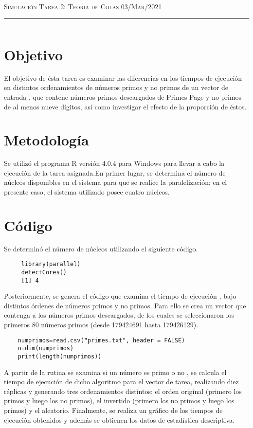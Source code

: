 \documentclass[12pt]{amsart}
\begin{document}
\pagestyle{empty}



\thispagestyle{empty}

{\scshape Simulación} \hfill {\scshape \Large Tarea 2: Teoría de Colas} \hfill  {\scshape 03/Mar/2021}
\author{C. María Montemayor Palos}
\maketitle

\hrule
\hrule
\bigskip


\section{Objetivo}
El objetivo de ésta tarea es examinar las diferencias en los tiempos de ejecución en distintos ordenamientos de números primos y no primos de un vector de entrada \cite{dra}, que contene números primos descargados de Primes Page \cite{primespage} y no primos de al menos nueve dígitos, así como investigar el efecto de la proporción de éstos.


\section{Metodología}
Se utilizó el programa R versión 4.0.4 \cite{R} para Windows para llevar a cabo la ejecución de la tarea asignada.En primer lugar, se determina el número de núcleos disponibles en el sistema para que se realice la paralelización; en el presente caso, el sistema utilizado posee cuatro núcleos.

\section{Código}
Se determinó el número de núcleos utilizando el siguiente código.
\begin{lstlisting}
     library(parallel)
     detectCores()
     [1] 4
\end{lstlisting}
Posteriormente, se genera el código que examina el tiempo de ejecución \cite{dra}, bajo distintos órdenes de números primos y no primos. Para ello se crea un vector que contenga a los números primos descargados, de los cuales se seleccionaron los primeros 80 números primos (desde 179424691 hasta 179426129).
\begin{lstlisting}
    numprimos=read.csv("primes.txt", header = FALSE)
    n=dim(numprimos)
    print(length(numprimos))
\end{lstlisting}
A partir de la rutina se examina si un número es primo o no \cite{dra}, se calcula el tiempo de ejecución de dicho algoritmo para el vector de tarea, realizando diez réplicas y generando tres ordenamientos distintos: el orden original (primero los primos y luego los no primos), el invertido (primero los no primos y luego los primos) y el aleatorio.  Finalmente, se realiza un gráfico de los tiempos de ejecución obtenidos y además se obtienen los datos de estadística descriptiva.
\end{document}
